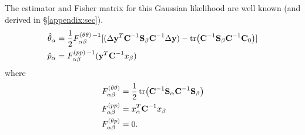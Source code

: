 \documentclass{article}
\begin{document}
The estimator and Fisher matrix for this Gaussian likelihood are well known (and derived in  \S\ref{appendix:sec}).
\begin{align}
\hat{\theta}_\alpha & = \frac{1}{2} F^{(\theta \theta)\,-1}_{\alpha \beta} [(\Delta \textbf{y}^T \textbf{C}^{-1} \textbf{S}_\beta \textbf{C}^{-1} \Delta \textbf{y}) - \tr(\textbf{C}^{-1} \textbf{S}_\beta \textbf{C}^{-1} \textbf{C}_0)] \nonumber \\
\hat{p}_\alpha  &=  F^{(pp)\, -1}_{\alpha \beta}  (\textbf{y}^T  \textbf{C}^{-1} x_\beta)
\label{estimators:eqn}
\end{align}
where  
\begin{align}
F^{(\theta\theta)}_{\alpha\beta}& = \frac{1}{2} \tr(\textbf{C}^{-1} \textbf{S}_\alpha \textbf{C}^{-1}  \textbf{S}_\beta)\\
F^{(pp)}_{\alpha\beta} & =x^T_\alpha \textbf{C}^{-1} x_\beta\\
F^{(\theta p)}_{\alpha\beta} & = 0.
\end{align}
\end{document}
